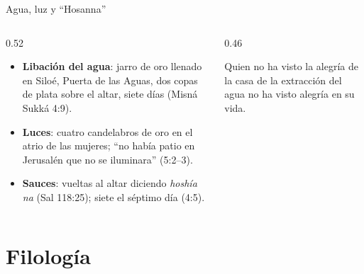 \begin{frame}{Agua, luz y ``Hosanna''}
\begin{columns}[t,onlytextwidth]
\begin{column}{0.52\textwidth}\scriptsize
\begin{itemize}
\item \textbf{Libación del agua}: jarro de oro llenado en Siloé, Puerta de las Aguas, dos copas de plata sobre el altar, siete días (Misná Sukká 4:9).
\item \textbf{Luces}: cuatro candelabros de oro en el atrio de las mujeres; ``no había patio en Jerusalén que no se iluminara'' (5:2--3).
\item \textbf{Sauces}: vueltas al altar diciendo \emph{hoshía na} (Sal 118:25); siete el séptimo día (4:5).
\end{itemize}
\end{column}
\begin{column}{0.46\textwidth}
\begin{cita}Quien no ha visto la alegría de la casa de la extracción del agua no ha visto alegría en su vida.\end{cita}
\end{column}
\end{columns}
\end{frame}

\section{Filología}

